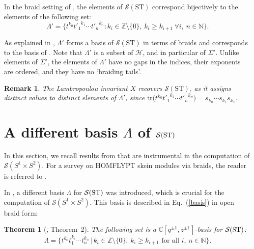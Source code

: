 \documentclass[11pt]{amsart}
\newtheorem{thm}{Theorem}
\newtheorem{remark}{Remark}
\begin{document}
\smallbreak

In the braid setting of \cite{La1}, the elements of \(\mathcal{S}(\mathrm{ST})\) correspond bijectively to the elements of the following set:
\begin{equation}\label{Lpr}
\Lambda' =
\bigl\{
t^{k_0} {t'_1}^{k_1} \cdots {t'_n}^{k_n} :
k_i\in\mathbb{Z}\setminus\{0\},\ k_i\geq k_{i+1}\ \forall i,\ n\in\mathbb{N}
\bigr\}.
\end{equation}




\noindent As explained in \cite{DL2}, \(\Lambda'\) forms a basis of \(\mathcal{S}(\mathrm{ST})\) in terms of braids and corresponds to the basis of \cite{HK}. Note that \(\Lambda'\) is a subset of \(\mathcal{H}\), and in particular of \(\Sigma'\). Unlike elements of \(\Sigma'\), the elements of \(\Lambda'\) have no gaps in the indices, their exponents are ordered, and they have no `braiding tails'.

\begin{remark}\rm
The Lambropoulou invariant \(X\) recovers \(\mathcal{S}(\mathrm{ST})\), as it assigns distinct values to distinct elements of \(\Lambda'\), since \(\mathrm{tr}\bigl(t^{k_0} {t'_1}^{k_1} \cdots {t'_n}^{k_n}\bigr) = s_{k_n}\cdots s_{k_1}s_{k_0}\).
\end{remark}





\section{A different basis \(\Lambda\) of \(\mathcal{S}({\rm ST})\)}\label{newbas}

In this section, we recall results from \cite{DL2, DLP, DL4} that are instrumental in the computation of \(\mathcal{S}(S^1\times S^2)\). For a survey on HOMFLYPT skein modules via braids, the reader is referred to \cite{DL3, DAMS, DGLM}.

\bigbreak

In \cite{DL2}, a different basis \(\Lambda\) for \(\mathcal{S}({\rm ST})\) was introduced, which is crucial for the computation of \(\mathcal{S}(S^1 \times S^2)\). This basis is described in Eq.~(\ref{basis}) in open braid form:

\begin{thm}[\cite{DL2}, Theorem~2] \label{newbasis}
The following set is a \(\mathbb{C}[q^{\pm1}, z^{\pm1}]\)-basis for \(\mathcal{S}({\rm ST})\):
\begin{equation}\label{basis}
\Lambda =
\bigl\{
t^{k_0} t_1^{k_1} \cdots t_n^{k_n} \,\big|\, k_i \in \mathbb{Z}\setminus\{0\},\ k_i \geq k_{i+1} \text{ for all } i,\ n \in \mathbb{N}
\bigr\}.
\end{equation}
\end{thm}
\end{document}

